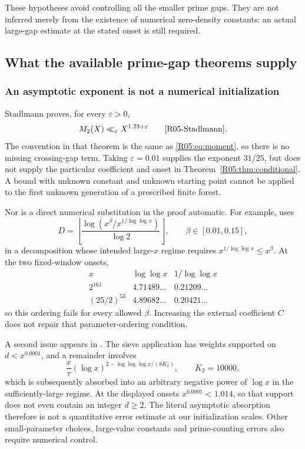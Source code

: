 \documentclass[11pt,a4paper]{article}
\theoremstyle{definition}\newtheorem{definition}[theorem]{Definition}
\theoremstyle{remark}\newtheorem{remark}[theorem]{Remark}
\newcommand{\floor}[1]{\left\lfloor#1\right\rfloor}
\begin{document}
These hypotheses avoid controlling all the smaller prime gaps.
They are not inferred merely from the existence of numerical
zero-density constants: an actual large-gap estimate at the stated
onset is still required.

\subsection{What the available prime-gap theorems supply}
\label{R05:sec:analytic}

\subsubsection{An asymptotic exponent is not a numerical initialization}

Stadlmann proves, for every $\varepsilon>0$,
\begin{equation}\label{R05:eq:stadlmann}
 M_2(X)\ll_\varepsilon X^{1.23+\varepsilon}
 \qquad\text{\cite[Theorem~1]{R05-Stadlmann}}.
\end{equation}
The convention in that theorem is the same as \eqref{R05:eq:moment}, so
there is no missing crossing-gap term. Taking $\varepsilon=0.01$
supplies the exponent $31/25$, but does not supply the particular
coefficient and onset in Theorem~\ref{R05:thm:conditional}.
A bound with unknown constant and unknown starting point cannot be
applied to the first unknown generation of a prescribed finite forest.

Nor is a direct numerical substitution in the proof automatic.
For example, \cite[Lemma~21, p.~43]{R05-Stadlmann} uses
\[
 D=\floor{\frac{\log(x^\beta/x^{1/\log\log x})}{\log2}},
 \qquad \beta\in[0.01,0.15],
\]
in a decomposition whose intended large-$x$ regime requires
$x^{1/\log\log x}\le x^\beta$.
At the two fixed-window onsets,
\[
 \begin{array}{c|c|c}
 x&\log\log x&1/\log\log x\\\hline
 2^{161}&4.71489\ldots&0.21209\ldots\\
 (25/2)^{53}&4.89682\ldots&0.20421\ldots
 \end{array}
\]
so this ordering fails for every allowed $\beta$.
Increasing the external coefficient $C$ does not repair that
parameter-ordering condition.

A second issue appears in \cite[Lemma~20 and equation~(5.15)]{R05-Stadlmann}.
The sieve application has weights supported on $d<x^{0.0001}$,
and a remainder involves
\[
 \frac{x}{\tau}(\log x)^{2-\log\log\log x/(8K_2)},
 \qquad K_2=10000,
\]
which is subsequently absorbed into an arbitrary negative power of
$\log x$ in the sufficiently-large regime.
At the displayed onsets $x^{0.0001}<1.014$, so that support does not
even contain an integer $d\ge2$. The literal asymptotic absorption
therefore is not a quantitative error estimate at our initialization
scales. Other small-parameter choices, large-value constants and
prime-counting errors also require numerical control.
\end{document}
